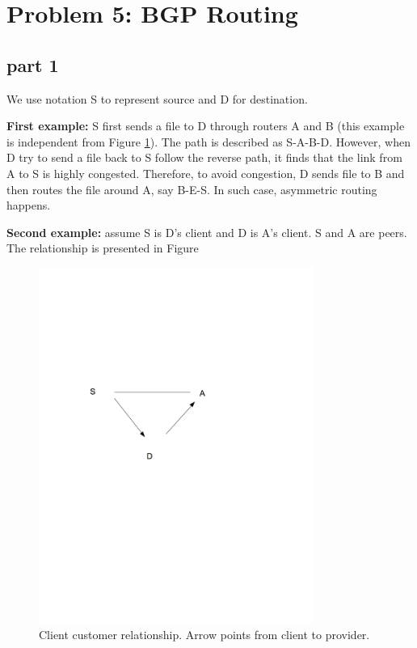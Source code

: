 \section{Problem 5: BGP Routing}
\subsection{part 1}

We use notation S to represent source and D for destination.

\textbf{First example:} S first sends a file to D through routers A and B (this example is independent from Figure \ref{fig:p5}). The path is described as S-A-B-D. However, when D try to send a file back to S follow the reverse path, it finds that the link from A to S is highly congested. Therefore, to avoid congestion, D sends file to B and then routes the file around A, say B-E-S. In such case, asymmetric routing happens.

\textbf{Second example:} assume S is D's client and D is A's client. S and A are peers. The relationship is presented in Figure

\begin{figure}[h]
    \centering
    \includegraphics[trim = 0 360 40 90mm, clip, width=0.8\textwidth]{p5.png}
    \caption{Client customer relationship. Arrow points from client to provider.}
    \label{fig:p5}
\end{figure}

